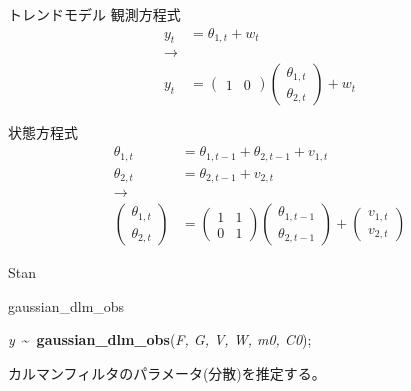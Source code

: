 \documentclass[dvipdfmx,12pt]{beamer}
\begin{document}
\begin{frame}{トレンドモデル}
  観測方程式
  \begin{align*}
    y_{t} &= \theta_{1,t} + w_{t} \\
    \rightarrow \\
    y_{t} &= \left(\begin{array}{cc}1 & 0\end{array}\right)
      \left(\begin{array}{c}\theta_{1,t} \\ \theta_{2,t} \end{array}\right) + w_{t} 
  \end{align*}

  状態方程式
  \begin{align*}
    \theta_{1,t} &= \theta_{1,t-1} + \theta_{2,t-1} + v_{1,t} \\
    \theta_{2,t} &= \theta_{2,t-1} + v_{2,t} \\
    \rightarrow \\
    \left(\begin{array}{c}\theta_{1,t} \\ \theta_{2,t}\end{array}\right) &=
    \left(\begin{array}{cc}1 & 1 \\ 0 & 1 \end{array}\right)
    \left(\begin{array}{c}\theta_{1,t-1} \\ \theta_{2,t-1}\end{array}\right) +
    \left(\begin{array}{c}v_{1,t} \\ v_{2,t}\end{array}\right)
  \end{align*}

\end{frame}

\begin{frame}{Stan}

\end{frame}

\begin{frame}{gaussian\_dlm\_obs}

  \textit{y}~\textasciitilde~\textbf{gaussian\_dlm\_obs}(\textit{F, G, V, W, m0, C0});

カルマンフィルタのパラメータ(分散)を推定する。

\end{frame}
\end{document}

